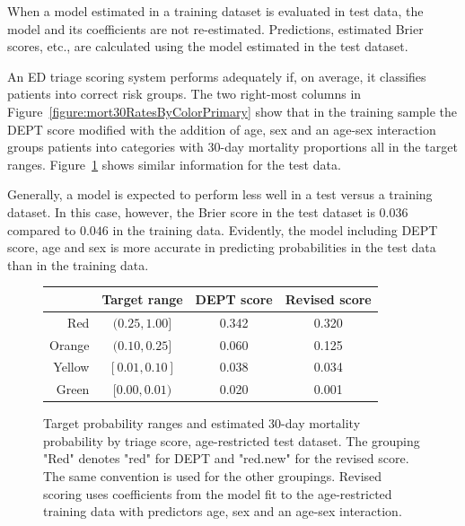 When a model estimated in a training dataset is evaluated in test data, the model and its coefficients are not re-estimated.  Predictions, estimated Brier scores, etc., are  calculated using the model estimated in the test dataset.  

An ED triage scoring system performs adequately if, on average, it classifies patients into correct risk groups.  The two right-most columns in Figure~\ref{figure:mort30RatesByColorPrimary}  show that in the training sample the DEPT score modified with the addition of age, sex and an age-sex interaction groups patients into categories with 30-day mortality proportions all in the target ranges.  Figure~\ref{figure:mort30RatesByColorValid} shows similar information for the test data.

Generally, a model is expected to perform less well in a test versus a training dataset.  In this case, however, the Brier score in the test dataset is $0.036$ compared to $0.046$ in the training data.  Evidently, the model including DEPT score, age and sex is more accurate in predicting probabilities in the test data than in the training data. 


\begin{figure}[ht]
  \centering
  \begin{tabular}{rccc}
    \hline
    & Target range & DEPT score & Revised score \\
    \hline
    Red & $ (0.25, 1.00]$ & 0.342 & 0.320 \\
  Orange & $(0.10, 0.25]$ & 0.060 & 0.125 \\
  Yellow & $ [0.01, 0.10]$ & 0.038 & 0.034 \\
  Green & $ [0.00, 0.01)$ & 0.020 & 0.001 \\
   \hline
\end{tabular}
\caption{Target probability ranges and estimated 30-day mortality probability by triage score, age-restricted test dataset. The grouping "Red" denotes "red" for DEPT and "red.new" for the revised score.  The same convention is used for the other groupings. Revised scoring uses coefficients from the model fit to the age-restricted training data with predictors  age, sex and an age-sex interaction.}
\label{figure:mort30RatesByColorValid}
\end{figure}


